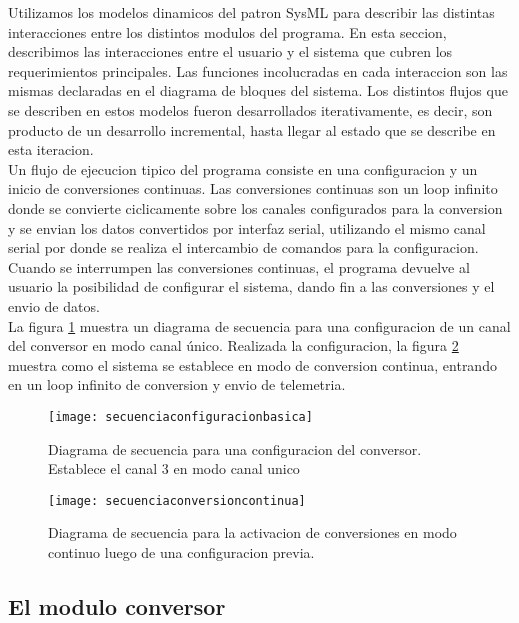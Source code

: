 Utilizamos los modelos dinamicos del patron SysML para describir las distintas interacciones entre los distintos modulos del programa. En esta seccion, describimos las interacciones entre el usuario y el sistema que cubren los requerimientos principales. Las funciones incolucradas en cada interaccion son las mismas declaradas en el diagrama de bloques del sistema. Los distintos flujos que se describen en estos modelos fueron desarrollados iterativamente, es decir, son producto de un desarrollo incremental, hasta llegar al estado que se describe en esta iteracion. \\

Un flujo de ejecucion tipico del programa consiste en una configuracion y un inicio de conversiones continuas. Las conversiones continuas son un loop infinito donde se convierte ciclicamente sobre los canales configurados para la conversion y se envian los datos convertidos por interfaz serial, utilizando el mismo canal serial por donde se realiza el intercambio de comandos para la configuracion. Cuando se interrumpen las conversiones continuas, el programa devuelve al usuario la posibilidad de configurar el sistema, dando fin a las conversiones y el envio de datos. \\

La figura \ref{fig:secuenciaconfiguracionbasica} muestra un diagrama de secuencia para una configuracion de un canal del conversor en modo canal único. Realizada la configuracion, la figura \ref{fig:secuenciaconversioncontinua} muestra como el sistema se establece en modo de conversion continua, entrando en un loop infinito de conversion y envio de telemetria.

\begin{figure}[h]
  \centering
  \texttt{[image: secuenciaconfiguracionbasica]}
  \caption{Diagrama de secuencia para una configuracion del conversor. Establece el canal 3 en modo canal unico}\label{fig:secuenciaconfiguracionbasica}
\end{figure}

\begin{figure}[h]
  \centering
  \texttt{[image: secuenciaconversioncontinua]}
  \caption{Diagrama de secuencia para la activacion de conversiones en modo continuo luego de una configuracion previa.}\label{fig:secuenciaconversioncontinua}
\end{figure}



\subsection{El modulo conversor} %
\label{it2:sub:el_modulo_conversor}

